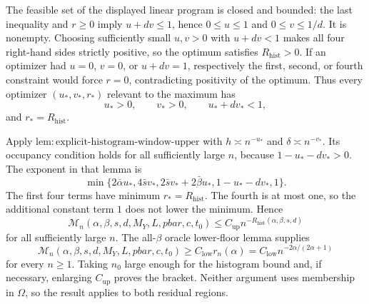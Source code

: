 The feasible set of the displayed linear program is closed and bounded: the last inequality and \(r\ge0\) imply \(u+dv\le1\), hence \(0\le u\le1\) and \(0\le v\le1/d\). It is nonempty. Choosing sufficiently small \(u,v>0\) with \(u+dv<1\) makes all four right-hand sides strictly positive, so the optimum satisfies \(R_{\mathrm{hist}}>0\). If an optimizer had \(u=0\), \(v=0\), or \(u+dv=1\), respectively the first, second, or fourth constraint would force \(r=0\), contradicting positivity of the optimum. Thus every optimizer \((u_*,v_*,r_*)\) relevant to the maximum has
\[
u_*>0,
\qquad v_*>0,
\qquad u_*+dv_*<1,
\]
and \(r_*=R_{\mathrm{hist}}\).

Apply \(\mathrm{lem:explicit\text{-}histogram\text{-}window\text{-}upper}\) with \(h\asymp n^{-u_*}\) and \(\delta\asymp n^{-v_*}\). Its occupancy condition holds for all sufficiently large \(n\), because \(1-u_*-dv_*>0\). The exponent in that lemma is
\[
\min\{2\bar\alpha u_*,4\bar s v_*,2\bar s v_*+2\bar\beta u_*,1-u_*-dv_*,1\}.
\]
The first four terms have minimum \(r_*=R_{\mathrm{hist}}\). The fourth is at most one, so the additional constant term \(1\) does not lower the minimum. Hence
\[
\mathcal M_n(\alpha,\beta,s,d,M_Y,L,pbar,c,t_0)
\le C_{\mathrm{up}}n^{-R_{\mathrm{hist}}(\alpha,\beta,s,d)}
\]
for all sufficiently large \(n\). The all-\(\beta\) oracle lower-floor lemma supplies
\[
\mathcal M_n(\alpha,\beta,s,d,M_Y,L,pbar,c,t_0)
\ge C_{\mathrm{low}}r_n(\alpha)
=C_{\mathrm{low}}n^{-2\alpha/(2\alpha+1)}
\]
for every \(n\ge1\). Taking \(n_0\) large enough for the histogram bound and, if necessary, enlarging \(C_{\mathrm{up}}\) proves the bracket. Neither argument uses membership in \(\Omega\), so the result applies to both residual regions.